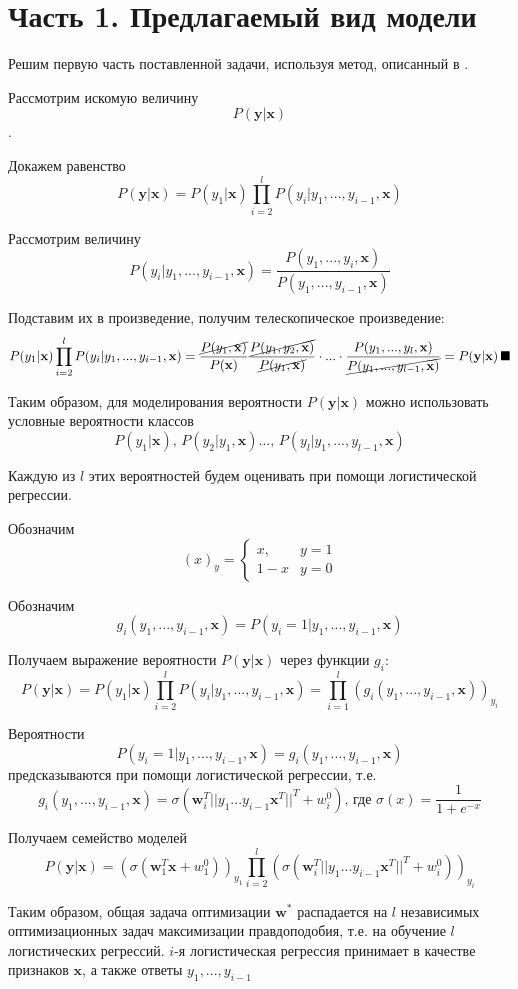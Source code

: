\documentclass[12pt,twoside]{article}
\newcommand{\x}{\mathbf{x}}
\newcommand{\w}{\mathbf{w}}
\newcommand{\y}{\mathbf{y}}
\begin{document}
\section{Часть 1. Предлагаемый вид модели}
Решим первую часть поставленной задачи, используя метод, описанный в \cite{weiwei2010}.

Рассмотрим искомую величину $$P(\y|\x)$$.

Докажем равенство $$P(\y|\x)=P(y_1|\x)\prod_{i=2}^lP(y_i|y_1,...,y_{i-1}, \x)$$

Рассмотрим величину $$P(y_i|y_1,...,y_{i-1},\x)=\frac{P(y_1,...,y_i,\x)}{P(y_1,...,y_{i-1},\x)}$$

Подставим их в произведение, получим телескопическое произведение: $$P(y_1|\x)\prod_{i=2}^lP(y_i|y_1,...,y_{i-1}, \x)=\frac{\cancel{P(y_1,\x)}}{P(\x)}\frac{\cancel{P(y_1,y_2,\x)}}{\cancel{P(y_1,\x)}}\cdot...\cdot\frac{P(y_1,...,y_l,\x)}{\cancel{P(y_1,...,y_{l-1},\x)}}=P(\y|\x)\,\blacksquare$$

Таким образом, для моделирования вероятности $P(\y|\x)$ можно использовать условные вероятности классов $$P(y_1|\x),\,P(y_2|y_1,\x)...,\,P(y_l|y_1,...,y_{l-1},\x)$$

Каждую из $l$ этих вероятностей будем оценивать при помощи логистической регрессии.

Обозначим $$(x)_{y}=\begin{cases}
x, & y = 1\\
1 - x & y = 0
\end{cases}$$

Обозначим $$g_i(y_1,...,y_{i-1},\x)=P(y_i=1|y_1,...,y_{i-1},\x)$$

Получаем выражение вероятности $P(\y|\x)$ через функции $g_i$: $$P(\y|\x)=P(y_1|\x)\prod\limits_{i=2}^lP(y_i|y_1,...,y_{i-1},\x)=\prod\limits_{i=1}^l(g_i(y_1,...,y_{i-1},\x))_{y_i}$$


Вероятности $$P(y_i=1|y_1,...,y_{i-1},\x)=g_i(y_1,...,y_{i-1},\x)$$
предсказываются при помощи логистической регрессии, т.е.
$$g_i(y_1,...,y_{i-1},\x)=\sigma(\w_i^T||y_1...y_{i-1}\x^T||^T+w^0_i)\mbox{, где }\sigma(x)=\frac{1}{1+e^{-x}}$$

Получаем семейство моделей $$P(\y|\x)=(\sigma(\w_1^T\x+w^0_1))_{y_1}\prod\limits_{i=2}^l(\sigma(\w_i^T||y_1...y_{i-1}\x^T||^T+w^0_i))_{y_i}$$

Таким образом, общая задача оптимизации $\w^*$ распадается на $l$ независимых оптимизационных задач максимизации правдоподобия, т.е. на обучение $l$ логистических регрессий. $i$-я логистическая регрессия принимает в качестве признаков $\x$, а также ответы $y_1,...,y_{i-1}$
\end{document}

